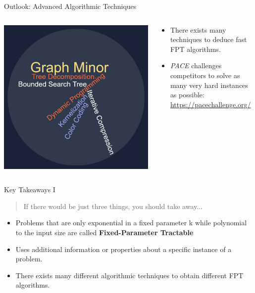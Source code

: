 \begin{frame}[c]{Outlook: Advanced Algorithmic Techniques}
\begin{columns}[c] %
\begin{column}{.48\textwidth}
    \begin{center}
        \includegraphics[scale=0.15]{img/wordcloud.jpg}
    \end{center}
\end{column}
\begin{column}{.48\textwidth}
    \begin{itemize}
        \item There exists many techniques to deduce fast FPT algorithms.
        \item \textit{PACE} challenges competitors to solve as many very hard instances as possible: \url{https://pacechallenge.org/}
    \end{itemize}
\end{column}
\end{columns}
\end{frame}

\begin{frame}[c]{Key Takeaways I}
\begin{center}
\begin{quote}
    If there would be just three things, you should take away...
\end{quote}
\begin{itemize}
    \pause\item Problems that are only exponential in a fixed parameter k while polynomial to the input size are called \textbf{Fixed-Parameter Tractable}
    \pause\item Uses additional information or properties about a specific instance of a problem.
    \pause\item There exists many different algorithmic techniques to obtain different FPT algorithms.
\end{itemize}
\end{center}
\end{frame}